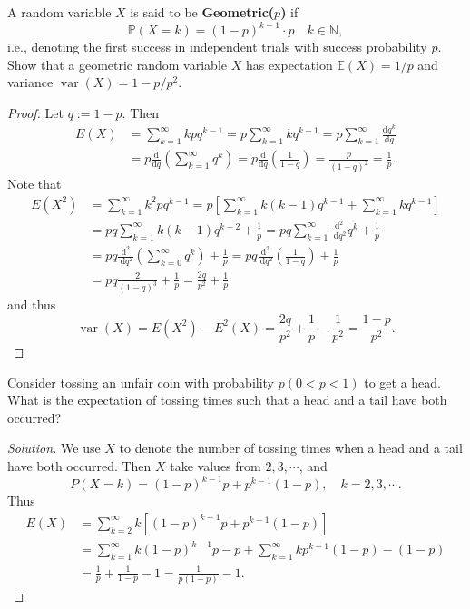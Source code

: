 \documentclass[11pt,singlecolumn, openany, citestyle=authoryear]{elegantbook}
\begin{document}
\begin{CJK}{UTF8}{gbsn}
\begin{example}
    A random variable $X$ is said to be \textbf{Geometric($p$)} if 
    $$
    \mathbb{P}(X=k)=(1-p)^{k-1}\cdot p \quad k \in \mathbb{N},
    $$
    i.e., denoting the first success in independent trials with success probability $p$. 
    Show that a geometric random variable $X$ has expectation 
    $\mathbb{E}(X)={1}/{p}$ and variance $\operatorname{var}(X)=1-p/p^2$.
\end{example}
\begin{proof}
    Let $q:=1-p$. Then 
    \begin{align*}
        E(X)&=\sum_{k=1}^\infty kpq^{k-1} = p\sum_{k=1}^\infty kq^{k-1} = 
        p\sum_{k=1}^\infty \frac{\mathrm{d}q^k}{\mathrm{d}q}\\
        &=p\frac{\mathrm{d}}{\mathrm{d}q}(\sum_{k=1}^\infty q^k)=
        p\frac{\mathrm{d}}{\mathrm{d}q}\left(\frac{1}{1-q}\right)=\frac{p}{(1-q)^2}=
        \frac{1}{p}.
    \end{align*}
    Note that 
\begin{align*}
       E(X^2)&=\sum_{k=1}^\infty k^2pq^{k-1}=p\left[
        \sum_{k=1}^\infty k(k-1)q^{k-1} + \sum_{k=1}^\infty kq^{k-1}
    \right]\\
    & =p q \sum_{k=1}^{\infty} k(k-1) q^{k-2}+\frac{1}{p}=p q \sum_{k=1}^{\infty} \frac{\mathrm{d}^2}{\mathrm{~d} q^2} q^k+\frac{1}{p} \\
& =p q \frac{\mathrm{d}^2}{\mathrm{~d} q^2}\left(\sum_{k=0}^{\infty} q^k\right)+\frac{1}{p}=p q \frac{\mathrm{d}^2}{\mathrm{~d} q^2}\left(\frac{1}{1-q}\right)+\frac{1}{p} \\
& =p q \frac{2}{(1-q)^3}+\frac{1}{p}=\frac{2 q}{p^2}+\frac{1}{p}
\end{align*}
and thus 
$$
\operatorname{var}(X)=E(X^2)-E^2(X)=\frac{2q}{p^2}+\frac{1}{p}-\frac{1}{p^2}=\frac{1-p}{p^2}.
$$
\end{proof}

\begin{example}
    Consider tossing an unfair coin with probability $p(0<p<1)$ to get a head. 
    What is the expectation of tossing times such that a head and a tail have both occurred?
\end{example}
\begin{proof}[Solution]
    We use $X$ to denote the 
    number of tossing times when a head and a tail have both occurred. Then $X$ take values 
    from $2,3,\cdots$, and
    $$
    P(X=k)=(1-p)^{k-1}p+p^{k-1}(1-p),\quad k= 2,3,\cdots.
    $$
    Thus 
    \begin{align*}
        E(X)&=\sum_{k=2}^\infty k[(1-p)^{k-1}p+p^{k-1}(1-p)]\\
        &=\sum_{k=1}^\infty k(1-p)^{k-1}p - p +\sum_{k=1}^\infty kp^{k-1}(1-p)-
        (1-p)\\
        &= \frac{1}{p}+\frac{1}{1-p}-1 =\frac{1}{p(1-p)}-1.
    \end{align*}
\end{proof}


\end{CJK}
\end{document}
